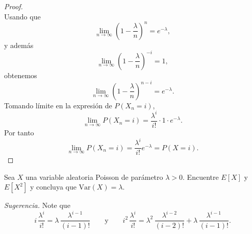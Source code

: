 \documentclass[12pt,a4paper]{article}
\newcommand{\paren}[1]{\left( #1 \right)}
\begin{document}
\begin{proof}
\begin{equation*}
        \end{equation*}
        Usando que
        \begin{equation*}
            \lim_{n\to\infty}\paren{1-\frac{\lambda}{n}}^{n}=e^{-\lambda},
        \end{equation*}
        y además
        \begin{equation*}
            \lim_{n\to\infty}\paren{1-\frac{\lambda}{n}}^{-i}=1,
        \end{equation*}
        obtenemos
        \begin{equation*}
            \lim_{n\to\infty}\paren{1-\frac{\lambda}{n}}^{n-i}=e^{-\lambda}.
        \end{equation*}
        Tomando límite en la expresión de $P(X_{n}=i)$,
        \begin{equation*}
            \lim_{n\to\infty}P(X_{n}=i)=\frac{\lambda^{i}}{i!}\cdot1\cdot e^{-\lambda}.
        \end{equation*}
        Por tanto
        \begin{equation*}
            \lim_{n\to\infty}P(X_{n}=i)=\frac{\lambda^{i}}{i!}e^{-\lambda}=P(X=i).
        \end{equation*}
    \end{proof}

    \begin{mdframed}[style=mdpinkbox, frametitle={Ejercicio 8}]
        Sea $X$ una variable aleatoria Poisson de parámetro $\lambda > 0$. Encuentre $E[X]$ y $E[X^2]$
        y concluya que $\mathrm{Var}(X) = \lambda$.

        \medskip
        \noindent\textit{Sugerencia.} Note que
        \begin{equation*}
            i\,\frac{\lambda^i}{i!} = \lambda\,\frac{\lambda^{i-1}}{(i-1)!}
            \qquad \text{y} \qquad
            i^2\,\frac{\lambda^i}{i!} = \lambda^2\,\frac{\lambda^{i-2}}{(i-2)!} + \lambda\,\frac{\lambda^{i-1}}{(i-1)!}.
        \end{equation*}
    \end{mdframed}

    
\end{document}

